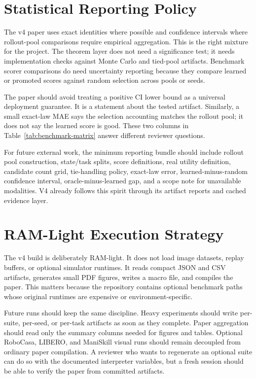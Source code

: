 \section{Statistical Reporting Policy}
\label{app:stat-reporting}

The v4 paper uses exact identities where possible and confidence intervals
where rollout-pool comparisons require empirical aggregation. This is the
right mixture for the project. The theorem layer does not need a significance
test; it needs implementation checks against Monte Carlo and tied-pool
artifacts. Benchmark scorer comparisons do need uncertainty reporting because
they compare learned or promoted scores against random selection across pools
or seeds.

The paper should avoid treating a positive CI lower bound as a universal
deployment guarantee. It is a statement about the tested artifact. Similarly,
a small exact-law MAE says the selection accounting matches the rollout pool;
it does not say the learned score is good. These two columns in
Table~\ref{tab:benchmark-matrix} answer different reviewer questions.

For future external work, the minimum reporting bundle should include rollout
pool construction, state/task splits, score definitions, real utility
definition, candidate count grid, tie-handling policy, exact-law error,
learned-minus-random confidence interval, oracle-minus-learned gap, and a
scope note for unavailable modalities. V4 already follows this spirit through
its artifact reports and cached evidence layer.

\section{RAM-Light Execution Strategy}
\label{app:ram-light}

The v4 build is deliberately RAM-light. It does not load image datasets, replay
buffers, or optional simulator runtimes. It reads compact JSON and CSV
artifacts, generates small PDF figures, writes a macro file, and compiles the
paper. This matters because the repository contains optional benchmark paths
whose original runtimes are expensive or environment-specific.

Future runs should keep the same discipline. Heavy experiments should write
per-suite, per-seed, or per-task artifacts as soon as they complete. Paper
aggregation should read only the summary columns needed for figures and tables.
Optional RoboCasa, LIBERO, and ManiSkill visual runs should remain decoupled
from ordinary paper compilation. A reviewer who wants to regenerate an optional
suite can do so with the documented interpreter variables, but a fresh session
should be able to verify the paper from committed artifacts.

